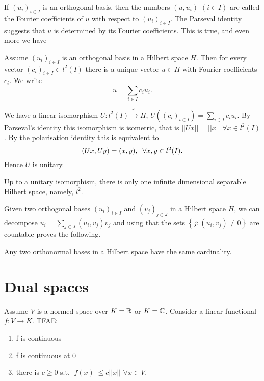 If $(u_i)_{i\in I}$ is an orthogonal basis, then the numbers $(u,u_i)$ $(i\in I)$ are called the \underline{Fourier coefficients} of $u$
with respect to $(u_i)_{i\in I}$. The Parseval identity suggests that $u$ is determined by its Fourier coefficients. This is true, and even more we have
\begin{proposition}
    Assume $(u_i)_{i\in I}$ is an orthogonal basis in a Hilbert space $H$. Then for every vector $(c_i)_{i\in I}\in l^2(I)$ there is a unique vector $u\in H$ with Fourier coefficients $c_i$.
    We write $$u = \sum_{i\in I} c_i u_i.$$
\end{proposition}

\begin{corollary}
    We have a linear isomorphism $U:l^2(I)\tilde\rightarrow H$, $U\left((c_i)_{i\in I}\right)=\sum_{i\in I} c_i u_i$.
    By Parseval's identity this isomorphism is isometric, that is $||Ux|| = ||x||$ $\forall x\in l^2(I)$. By the polarisation
    identity this is equivalent to $$(Ux,Uy)=(x,y),\hspace{2mm}\forall x,y\in l^2(I).$$
    Hence $U$ is unitary.
\end{corollary}

\begin{corollary}
    Up to a unitary isomorphism, there is only one infinite dimensional separable Hilbert space, namely, $l^2$.
\end{corollary}

Given two orthogonal bases $(u_i)_{i\in I}$ and $(v_j)_{j\in J}$ in a Hilbert space $H$, we can decompose $u_i=\sum_{j\in J}(u_i,v_j)v_j$ and using that the sets $\left\{ j:(u_i,v_j)\neq 0 \right\}$ are countable proves the following.
\begin{remark}
    Any two orthonormal bases in a Hilbert space have the same cardinality. 
\end{remark}

\section*{Dual spaces}
\begin{lemma}
    Assume $V$ is a normed space over $K=\mathbb{R}$ or $K=\mathbb{C}$. Consider a linear functional $f:V\rightarrow K$. TFAE:
    \begin{enumerate}
        \item f is continuous
        \item f is continuous at 0
        \item there is $c\geq 0$ s.t. $|f(x)|\leq c||x||$ $\forall x\in V$.
    \end{enumerate}
\end{lemma}

